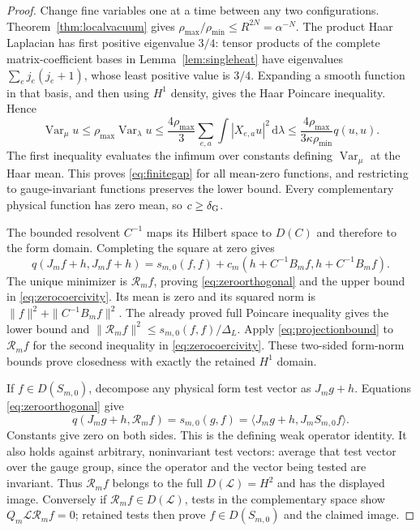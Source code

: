 \documentclass[11pt]{article}
\newcommand{\Var}{\operatorname{Var}}
\newcommand{\dd}{\,\mathrm d}
\newcommand{\LL}{\mathscr L}
\begin{document}
\begin{proof}
Change fine variables one at a time between any two configurations.
Theorem~\ref{thm:localvacuum} gives
$\rho_{\max}/\rho_{\min}\leq R^{2N}=\alpha^{-N}$.
The product Haar Laplacian has first positive eigenvalue $3/4$:
tensor products of the complete matrix-coefficient bases in
Lemma~\ref{lem:singleheat} have eigenvalues
$\sum_e j_e(j_e+1)$, whose least positive value is $3/4$.
Expanding a smooth function in that basis, and then using $H^1$
density, gives the Haar Poincare inequality. Hence
\[
 \Var_\mu u
 \leq\rho_{\max}\Var_\lambda u
 \leq\frac{4\rho_{\max}}3\sum_{e,a}\int|X_{e,a}u|^2\dd\lambda
 \leq\frac{4\rho_{\max}}{3\kappa\rho_{\min}}q(u,u).
\]
The first inequality evaluates the infimum over constants defining
$\Var_\mu$ at the Haar mean. This proves \eqref{eq:finitegap} for all
mean-zero functions, and restricting to gauge-invariant functions
preserves the lower bound. Every complementary physical function has
zero mean, so $c\geq\delta_{\rm G}$.

The bounded resolvent $C^{-1}$ maps its Hilbert space to $D(C)$ and
therefore to the form domain. Completing the square at zero gives
\[
 q(J_mf+h,J_mf+h)
 =s_{m,0}(f,f)+c_m(h+C^{-1}B_mf,h+C^{-1}B_mf).
\]
The unique minimizer is $\mathcal R_m f$, proving
\eqref{eq:zeroorthogonal} and the upper bound in
\eqref{eq:zerocoercivity}. Its mean is zero and its squared norm is
$\|f\|^2+\|C^{-1}B_mf\|^2$. The already proved full Poincare inequality
gives the lower bound and
$\|\mathcal R_m f\|^2\leq s_{m,0}(f,f)/\Delta_L$.
Apply \eqref{eq:projectionbound} to $\mathcal R_m f$ for the second
inequality in \eqref{eq:zerocoercivity}. These two-sided form-norm
bounds prove closedness with exactly the retained $H^1$ domain.

If $f\in D(S_{m,0})$, decompose any physical form test vector as
$J_mg+h$. Equations \eqref{eq:zeroorthogonal} give
\[
 q(J_mg+h,\mathcal R_m f)=s_{m,0}(g,f)
                       =\langle J_mg+h,J_mS_{m,0}f\rangle .
\]
Constants give zero on both sides. This is the defining weak operator
identity. It also holds against arbitrary, noninvariant test vectors:
average that test vector over the gauge group, since the operator and
the vector being tested are invariant. Thus $\mathcal R_m f$ belongs
to the full $D(\LL)=H^2$ and has the displayed image.
Conversely if $\mathcal R_m f\in D(\LL)$, tests in the complementary
space show $Q_m\LL\mathcal R_m f=0$; retained tests then prove
$f\in D(S_{m,0})$ and the claimed image.
\end{proof}
\end{document}
